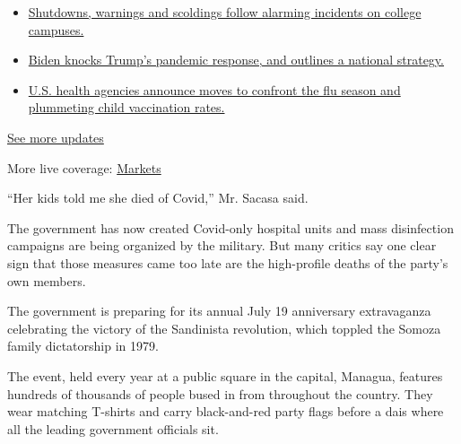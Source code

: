 \begin{itemize}
\tightlist
\item
  \href{https://www.nytimes3xbfgragh.onion/2020/08/20/world/coronavirus-covid.html?action=click\&pgtype=Article\&state=default\&region=MAIN_CONTENT_1\&context=storylines_live_updates\#link-68774d88}{Shutdowns,
  warnings and scoldings follow alarming incidents on college campuses.}
\item
  \href{https://www.nytimes3xbfgragh.onion/2020/08/20/world/coronavirus-covid.html?action=click\&pgtype=Article\&state=default\&region=MAIN_CONTENT_1\&context=storylines_live_updates\#link-26b58724}{Biden
  knocks Trump's pandemic response, and outlines a national strategy.}
\item
  \href{https://www.nytimes3xbfgragh.onion/2020/08/20/world/coronavirus-covid.html?action=click\&pgtype=Article\&state=default\&region=MAIN_CONTENT_1\&context=storylines_live_updates\#link-4e542da3}{U.S.
  health agencies announce moves to confront the flu season and
  plummeting child vaccination rates.}
\end{itemize}

\href{https://www.nytimes3xbfgragh.onion/2020/08/20/world/coronavirus-covid.html?action=click\&pgtype=Article\&state=default\&region=MAIN_CONTENT_1\&context=storylines_live_updates}{See
more updates}

More live coverage:
\href{https://www.nytimes3xbfgragh.onion/live/2020/08/20/business/stock-market-today-coronavirus?action=click\&pgtype=Article\&state=default\&region=MAIN_CONTENT_1\&context=storylines_live_updates}{Markets}

``Her kids told me she died of Covid,'' Mr. Sacasa said.

The government has now created Covid-only hospital units and mass
disinfection campaigns are being organized by the military. But many
critics say one clear sign that those measures came too late are the
high-profile deaths of the party's own members.

The government is preparing for its annual July 19 anniversary
extravaganza celebrating the victory of the Sandinista revolution, which
toppled the Somoza family dictatorship in 1979.

The event, held every year at a public square in the capital, Managua,
features hundreds of thousands of people bused in from throughout the
country. They wear matching T-shirts and carry black-and-red party flags
before a dais where all the leading government officials sit.

